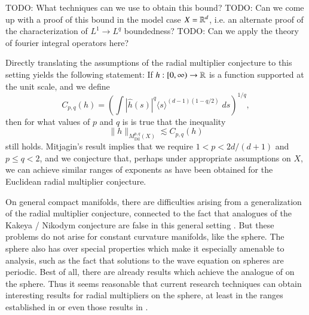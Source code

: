 TODO: What techniques can we use to obtain this bound? TODO: Can we come up with a proof of this bound in the model case $X = \operatorname{\mathbb{R}}^d$, i.e. an alternate proof of the characterization of $L^1 \to L^q$ boundedness? TODO: Can we apply the theory of fourier integral operators here?
%
%
%

Directly translating the assumptions of the radial multiplier conjecture to this setting yields the following statement: If $h: [0,\infty) \to \operatorname{\mathbb{R}}$ is a function supported at the unit scale, and we define
%
\[ C_{p,q}(h) = \left( \int |\widehat{h}(s)|^q \langle s \rangle^{(d-1)(1 - q/2)}\; ds \right)^{1/q}, \]
%
then for what values of $p$ and $q$ is is true that the inequality
%
\[ \| h \|_{M^{p,q}_{\text{Dil}}(X)} \lesssim C_{p,q}(h) \]
%
still holds. Mitjagin's result implies that we require $1 < p < 2d/(d+1)$ and $p \leq q < 2$, and we conjecture that, perhaps under appropriate assumptions on $X$, we can achieve similar ranges of exponents as have been obtained for the Euclidean radial multiplier conjecture.

On general compact manifolds, there are difficulties arising from a generalization of the radial multiplier conjecture, connected to the fact that analogues of the Kakeya / Nikodym conjecture are false in this general setting \cite{Minicozzi}. But these problems do not arise for constant curvature manifolds, like the sphere. The sphere also has over special properties which make it especially amenable to analysis, such as the fact that solutions to the wave equation on spheres are periodic. Best of all, there are already results which achieve the analogue of \cite{GarrigosandSeeger} on the sphere. Thus it seems reasonable that current research techniques can obtain interesting results for radial multipliers on the sphere, at least in the ranges established in \cite{HeoandNazarovandSeeger} or even those results in \cite{Cladek}.

